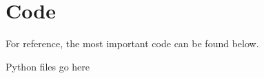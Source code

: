 \section{Code}
\label{apx:code}
For reference, the most important code can be found below.

Python files go here